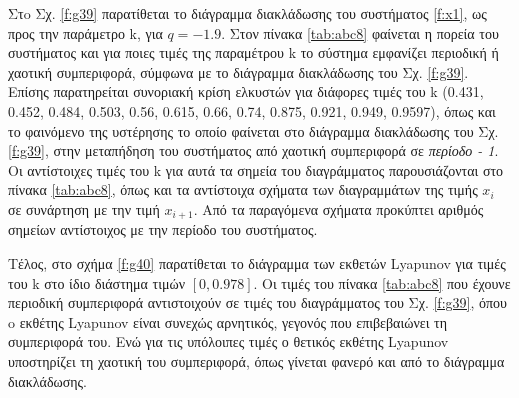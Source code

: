 Στo Σχ. \ref{f:g39} παρατίθεται το διάγραμμα διακλάδωσης του συστήματος \ref{f:x1}, ως προς την παράμετρο k, για $q =- 1.9$. 
Στον πίνακα \ref{tab:abc8} φαίνεται η πορεία του συστήματος και για ποιες τιμές της παραμέτρου k το σύστημα εμφανίζει περιοδική ή χαοτική συμπεριφορά, σύμφωνα με το διάγραμμα διακλάδωσης του Σχ. \ref{f:g39}. Επίσης παρατηρείται συνοριακή κρίση ελκυστών για διάφορες τιμές του k (0.431, 0.452, 0.484, 0.503, 0.56, 0.615, 0.66, 0.74, 0.875, 0.921, 0.949, 0.9597), όπως και το φαινόμενο της υστέρησης το οποίο φαίνεται στο διάγραμμα διακλάδωσης του Σχ. \ref{f:g39}, στην μεταπήδηση του συστήματος από χαοτική συμπεριφορά σε \emph{περίοδο - 1}. Οι αντίστοιχες τιμές του k για αυτά τα σημεία του διαγράμματος παρουσιάζονται στο πίνακα \ref{tab:abc8}, όπως και τα αντίστοιχα σχήματα των διαγραμμάτων της τιμής \(x_i\) σε συνάρτηση με την τιμή \(x_{i+1}\). Από τα παραγόμενα σχήματα προκύπτει αριθμός σημείων αντίστοιχος με την περίοδο του συστήματος.

Τέλος, στο σχήμα \ref{f:g40} παρατίθεται το διάγραμμα των εκθετών Lyapunov για τιμές του k στο ίδιο διάστημα τιμών $[0, 0.978]$. Οι τιμές του πίνακα \ref{tab:abc8} που έχουνε περιοδική συμπεριφορά αντιστοιχούν σε τιμές του διαγράμματος του Σχ. \ref{f:g39}, όπου o εκθέτης Lyapunov είναι συνεχώς αρνητικός, γεγονός που επιβεβαιώνει τη συμπεριφορά του. Ενώ για τις υπόλοιπες τιμές ο θετικός εκθέτης Lyapunov υποστηρίζει τη χαοτική του συμπεριφορά, όπως γίνεται φανερό και από το διάγραμμα διακλάδωσης.\\\\

